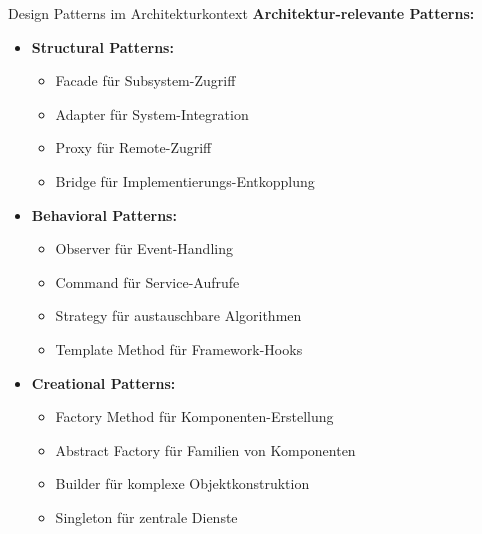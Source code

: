 \begin{concept}{Design Patterns im Architekturkontext}
\textbf{Architektur-relevante Patterns:}
\begin{itemize}
    \item \textbf{Structural Patterns:}
    \begin{itemize}
        \item Facade für Subsystem-Zugriff
        \item Adapter für System-Integration
        \item Proxy für Remote-Zugriff
        \item Bridge für Implementierungs-Entkopplung
    \end{itemize}
    
    \item \textbf{Behavioral Patterns:}
    \begin{itemize}
        \item Observer für Event-Handling
        \item Command für Service-Aufrufe
        \item Strategy für austauschbare Algorithmen
        \item Template Method für Framework-Hooks
    \end{itemize}
    
    \item \textbf{Creational Patterns:}
    \begin{itemize}
        \item Factory Method für Komponenten-Erstellung
        \item Abstract Factory für Familien von Komponenten
        \item Builder für komplexe Objektkonstruktion
        \item Singleton für zentrale Dienste
    \end{itemize}
\end{itemize}
\end{concept}

